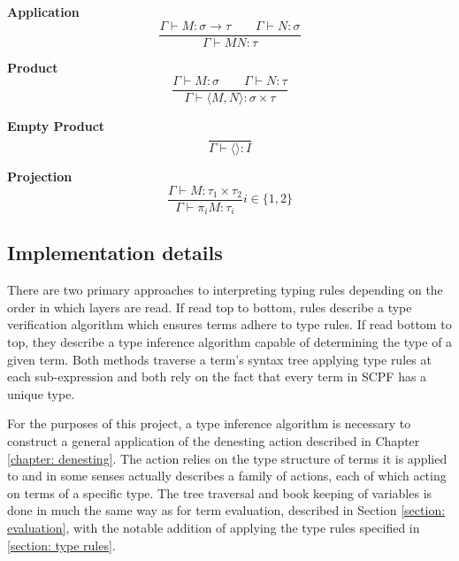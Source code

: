 \documentclass[12pt,a4paper]{report}
\theoremstyle{definition}
\theoremstyle{remark}
\begin{document}
\textbf{Application}
\begin{equation}
    \frac{\Gamma \vdash M : \sigma \rightarrow \tau \quad\quad \Gamma \vdash N : \sigma}{\Gamma \vdash MN : \tau}
\end{equation}

\textbf{Product}
\begin{equation}
    \frac{\Gamma \vdash M:\sigma \quad\quad \Gamma \vdash N:\tau}{\Gamma \vdash \langle M,N \rangle : \sigma \times \tau}
\end{equation}

\textbf{Empty Product}
\begin{equation}
    \frac{}{\Gamma \vdash \langle \rangle : I}
\end{equation}

\textbf{Projection}
\begin{equation}
    \frac{\Gamma \vdash M:\tau_1 \times \tau_2}{\Gamma \vdash \pi_i M: \tau_i} i \in \{1, 2\}
\end{equation}

\subsection{Implementation details} 
There are two primary approaches to interpreting typing rules depending on the order in which layers are read. If read top to bottom, rules describe a type verification algorithm which ensures terms adhere to type rules. If read bottom to top, they describe a type inference algorithm capable of determining the type of a given term. Both methods traverse a term's syntax tree applying type rules at each sub-expression and both rely on the fact that every term in SCPF has a unique type.

For the purposes of this project, a type inference algorithm is necessary to construct a general application of the denesting action described in Chapter \ref{chapter: denesting}. The action relies on the type structure of terms it is applied to and in some senses actually describes a family of actions, each of which acting on terms of a specific type. The tree traversal and book keeping of variables is done in much the same way as for term evaluation, described in Section \ref{section: evaluation}, with the notable addition of applying the type rules specified in \ref{section: type rules}.
\end{document}
